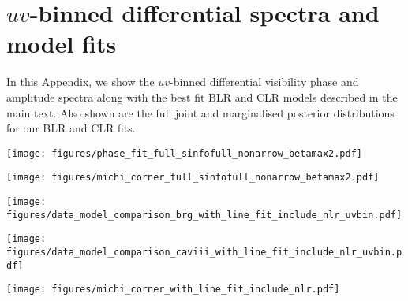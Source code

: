 \documentclass[longauth,]{aa}
\newcommand{\brg}{Br$\gamma$}
\newcommand{\caviii}{[\ion{Ca}{viii}]}
\begin{document}
\section{$uv$-binned differential spectra and model fits}\label{app:uv_bin_spec}
In this Appendix, we show the $uv$-binned differential visibility phase and amplitude spectra along with the best fit BLR and CLR models described in the main text. Also shown are the full joint and marginalised posterior distributions for our BLR and CLR fits.
%
\begin{figure*}
    \centering
    \texttt{[image: figures/phase\_fit\_full\_sinfofull\_nonarrow\_betamax2.pdf]}
    \caption{\textit{top row:} Normalized \brg{} profile (black points) with best fit model line profile (red line). \textit{bottom rows:}$uv$-binned, continuum phase subtracted differential phase spectra for each baseline (coloured points) with the best fit BLR model spectra (solid lines). Model spectra for the BLR component are shown as dashed lines while the offset component is shown as dotted lines.}
    \label{fig:uvbin_bry_visphi}
\end{figure*}
%
\begin{figure*}
    \centering
    \texttt{[image: figures/michi\_corner\_full\_sinfofull\_nonarrow\_betamax2.pdf]}
    \caption{Corner plot for our BLR model fit showing the joint and marginalised posterior distributions for each free parameter. The blue lines and orange crosses indicate the maximum \textit{a posteriori} position used as the best fit values given in Table~\ref{tab:blr}}
    \label{fig:corner_blr}
\end{figure*}
%
\begin{figure*}
    \centering
    \texttt{[image: figures/data\_model\_comparison\_brg\_with\_line\_fit\_include\_nlr\_uvbin.pdf]}
    \caption{\textit{top row:} Normalized GRAVITY \brg{} profile (black points) with best fit model line profile (red line) from our coronal line region analysis. \textit{bottom rows:}$uv$-binned differential visibility amplitude spectra for each baseline (coloured points and lines) with the best fit CLR model (solid lines).}
    \label{fig:uvbin_bry_visamp}
\end{figure*}
%
\begin{figure*}
    \centering
    \texttt{[image: figures/data\_model\_comparison\_caviii\_with\_line\_fit\_include\_nlr\_uvbin.pdf]}
    \caption{Same as Fig.~\ref{fig:uvbin_bry_visamp} but for the \caviii{} line.}
    \label{fig:uvbin_caviii_visamp}
\end{figure*}
%
\begin{figure*}
    \centering
    \texttt{[image: figures/michi\_corner\_with\_line\_fit\_include\_nlr.pdf]}
    \caption{Corner plot for our CLR analysis showing the joint and marginalised posterior distributions for each free parameter. The blue lines and orange crosses indicate the maximum \textit{a posteriori} position used as the best fit values given in Table~\ref{tab:clr}}
    \label{fig:corner_clr}
\end{figure*}
%
\end{document}
